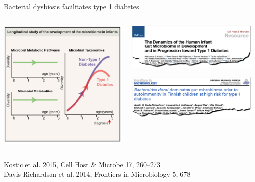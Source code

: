 \documentclass[10pt]{beamer}
\newcommand{\credit}[1]{{\vspace{\fill} \par \raggedleft \scriptsize \mdseries \color{mDarkBrown} #1 \par}}
\begin{document}
\begin{frame}{Bacterial dysbiosis facilitates type 1 diabetes}
	\vspace{1cm}
	\begin{columns}
		\begin{column}{0.4\textwidth}
			\includegraphics[width=\textwidth]{./figures/diabetes3.png}
		\end{column}
		\begin{column}{0.7\textwidth}
			\begin{center}
				\includegraphics[width=\textwidth]{./figures/diabetes1.png}\par
				\includegraphics[width=\textwidth]{./figures/diabetes2.png}
			\end{center}
		\end{column}
	\end{columns}
	\credit{Kostic et al. 2015, Cell Host \& Microbe 17, 260–273 \\
		Davis-Richardson et al. 2014, Frontiers in Microbiology 5, 678}
\end{frame}
\end{document}
